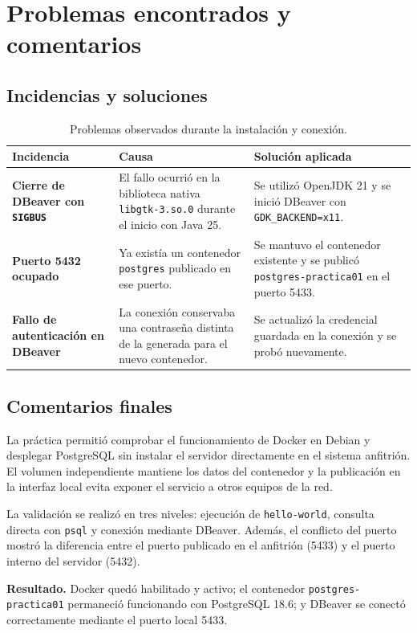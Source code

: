 \section{Problemas encontrados y comentarios}

\subsection{Incidencias y soluciones}

\begin{table}[H]
  \centering
  \begin{tabularx}{\textwidth}{>{\raggedright\arraybackslash\bfseries}p{}XX}
    \toprule
    Incidencia & Causa & Solución aplicada \\
    \midrule
    Cierre de DBeaver con \texttt{SIGBUS} & El fallo ocurrió en la biblioteca
    nativa \texttt{libgtk-3.so.0} durante el inicio con Java 25. & Se utilizó
    OpenJDK 21 y se inició DBeaver con \texttt{GDK\_BACKEND=x11}. \\
    \addlinespace
    Puerto 5432 ocupado & Ya existía un contenedor \texttt{postgres} publicado
    en ese puerto. & Se mantuvo el contenedor existente y se publicó
    \texttt{postgres-practica01} en el puerto 5433. \\
    \addlinespace
    Fallo de autenticación en DBeaver & La conexión conservaba una contraseña
    distinta de la generada para el nuevo contenedor. & Se actualizó la
    credencial guardada en la conexión y se probó nuevamente. \\
    \bottomrule
  \end{tabularx}
  \caption{Problemas observados durante la instalación y conexión.}
\end{table}


\subsection{Comentarios finales}

La práctica permitió comprobar el funcionamiento de Docker en Debian y
desplegar PostgreSQL sin instalar el servidor directamente en el sistema
anfitrión. El volumen independiente mantiene los datos del contenedor y la
publicación en la interfaz local evita exponer el servicio a otros equipos de
la red.

La validación se realizó en tres niveles: ejecución de \texttt{hello-world},
consulta directa con \texttt{psql} y conexión mediante DBeaver. Además, el
conflicto del puerto mostró la diferencia entre el puerto publicado en el
anfitrión (5433) y el puerto interno del servidor (5432).

\textbf{Resultado.} Docker quedó habilitado y activo; el contenedor
\texttt{postgres-practica01} permaneció funcionando con PostgreSQL 18.6; y
DBeaver se conectó correctamente mediante el puerto local 5433.
